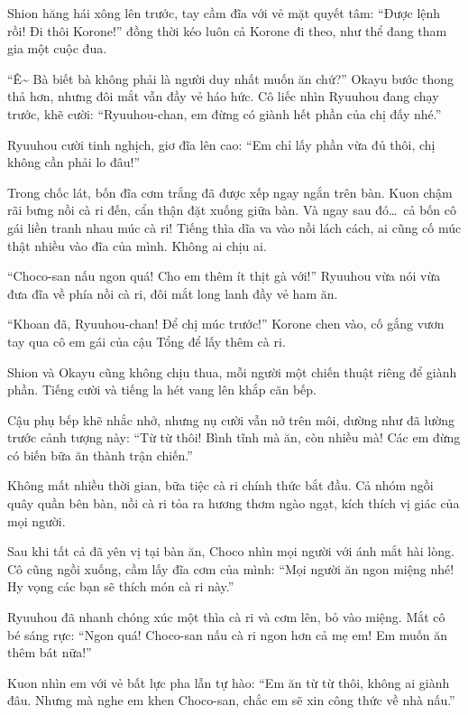 \documentclass[../main.tex]{subfiles}
\begin{document}
Shion hăng hái xông lên trước, tay cầm đĩa với vẻ mặt quyết tâm: ``Được lệnh rồi! Đi thôi Korone!'' đồng thời kéo luôn cả Korone đi theo, như thể đang tham gia một cuộc đua.

``Ê\~{} Bà biết bà không phải là người duy nhất muốn ăn chứ?'' Okayu bước thong thả hơn, nhưng đôi mắt vẫn đầy vẻ háo hức. Cô liếc nhìn Ryuuhou đang chạy trước, khẽ cười: ``Ryuuhou-chan, em đừng có giành hết phần của chị đấy nhé.''

Ryuuhou cười tinh nghịch, giơ đĩa lên cao: ``Em chỉ lấy phần vừa đủ thôi, chị không cần phải lo đâu!''

\ct

Trong chốc lát, bốn đĩa cơm trắng đã được xếp ngay ngắn trên bàn. Kuon chậm rãi bưng nồi cà ri đến, cẩn thận đặt xuống giữa bàn. Và ngay sau đó\dots\ cả bốn cô gái liền tranh nhau múc cà ri! Tiếng thìa dĩa va vào nồi lách cách, ai cũng cố múc thật nhiều vào đĩa của mình. Không ai chịu ai.

``Choco-san nấu ngon quá! Cho em thêm ít thịt gà với!'' Ryuuhou vừa nói vừa đưa đĩa về phía nồi cà ri, đôi mắt long lanh đầy vẻ ham ăn.

``Khoan đã, Ryuuhou-chan! Để chị múc trước!'' Korone chen vào, cố gắng vươn tay qua cô em gái của cậu Tổng để lấy thêm cà ri.

Shion và Okayu cũng không chịu thua, mỗi người một chiến thuật riêng để giành phần. Tiếng cười và tiếng la hét vang lên khắp căn bếp.

Cậu phụ bếp khẽ nhắc nhở, nhưng nụ cười vẫn nở trên môi, dường như đã lường trước cảnh tượng này: ``Từ từ thôi! Bình tĩnh mà ăn, còn nhiều mà! Các em đừng có biến bữa ăn thành trận chiến.''

Không mất nhiều thời gian, bữa tiệc cà ri chính thức bắt đầu. Cả nhóm ngồi quây quần bên bàn, nồi cà ri tỏa ra hương thơm ngào ngạt, kích thích vị giác của mọi người.

Sau khi tất cả đã yên vị tại bàn ăn, Choco nhìn mọi người với ánh mắt hài lòng. Cô cũng ngồi xuống, cầm lấy đĩa cơm của mình: ``Mọi người ăn ngon miệng nhé! Hy vọng các bạn sẽ thích món cà ri này.''

Ryuuhou đã nhanh chóng xúc một thìa cà ri và cơm lên, bỏ vào miệng. Mắt cô bé sáng rực: ``Ngon quá! Choco-san nấu cà ri ngon hơn cả mẹ em! Em muốn ăn thêm bát nữa!''

Kuon nhìn em với vẻ bất lực pha lẫn tự hào: ``Em ăn từ từ thôi, không ai giành đâu. Nhưng mà nghe em khen Choco-san, chắc em sẽ xin công thức về nhà nấu.''
\end{document}
